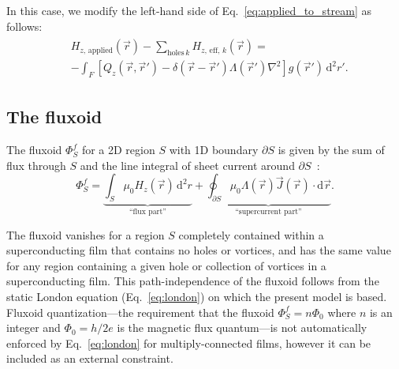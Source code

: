 \documentclass[final,3p,times,twocolumn]{elsarticle}
\newcounter{bla}
\begin{document}
In this case, we modify the left-hand side of Eq.~\ref{eq:applied_to_stream} as follows:
\begin{align}
\begin{split}
    \label{eq:Heff_sub}
    &H_{z,\,\mathrm{applied}}(\vec{r}) - \sum_{\mathrm{holes}\,k} H_{z,\,\mathrm{eff},\,k}(\vec{r})
    = \\&-\int_F\left[
        Q_z(\vec{r},\vec{r}')-\delta(\vec{r}-\vec{r}')\Lambda(\vec{r}')\nabla^2\right
    ]g(\vec{r}')\,\mathrm{d}^2r'.
\end{split}
\end{align}

\subsection{The fluxoid}
\label{section:model:fluxoid}

The fluxoid $\Phi^f_S$ for a 2D region $S$ with 1D boundary $\partial S$ is given by the sum of flux through $S$ and the line integral of sheet current around $\partial S$~\cite{Brandt2005-wj,Clem2005-ye,Tinkham2004-zn}:
\begin{equation}
    \Phi^f_S = \underbrace{\int_S\mu_0H_z(\vec{r})\,\mathrm{d}^2r}_\text{``flux part''} + \underbrace{\oint_{\partial S}\mu_0\Lambda(\vec{r})\vec{J}(\vec{r})\cdot\mathrm{d}\vec{r}}_\text{``supercurrent part''}.
    \label{eq:fluxoid}
\end{equation}

The fluxoid vanishes for a region $S$ completely contained within a superconducting film that contains no holes or vortices, and has the same value for any region containing a given hole or collection of vortices in a superconducting film. This path-independence of the fluxoid follows from the static London equation (Eq.~\ref{eq:london}) on which the present model is based. Fluxoid quantization---the requirement that the fluxoid $\Phi^f_S=n\Phi_0$ where $n$ is an integer and $\Phi_0=h/2e$ is the magnetic flux quantum---is not automatically enforced by Eq.~\ref{eq:london} for multiply-connected films, however it can be included as an external constraint.
\end{document}
